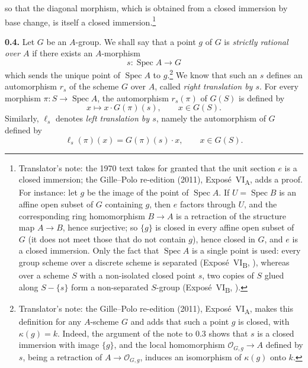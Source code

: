 \begin{center}
  \label{sga3:VIA:0.3-cartesian-square}
\end{center}
so that the diagonal morphism, which is obtained from a closed immersion
by base change, is itself a closed immersion.\footnote{Translator's note: the 1970 text takes for granted that the unit
section \(e\) is a closed immersion; the Gille--Polo re-edition (2011), Exposé~VI\textsubscript{A}, adds a
proof. For instance: let \(g\) be the image of the point of \(\operatorname{Spec}A\). If
\(U=\operatorname{Spec}B\) is an affine open subset of \(G\) containing \(g\), then \(e\) factors through
\(U\), and the corresponding ring homomorphism \(B\to A\) is a retraction of the structure map
\(A\to B\), hence surjective; so \(\{g\}\) is closed in every affine open subset of \(G\) (it does not
meet those that do not contain \(g\)), hence closed in \(G\), and \(e\) is a closed immersion. Only the
fact that \(\operatorname{Spec}A\) is a single point is used: every group scheme over a discrete scheme
is separated (Exposé~VI\textsubscript{B}, ), whereas over a scheme \(S\) with a
non-isolated closed point \(s\), two copies of \(S\) glued along \(S-\{s\}\) form a non-separated
\(S\)-group (Exposé~VI\textsubscript{B}, ).}


\medskip
\noindent\textbf{0.4.}
\label{sga3:VIA:0.4}
Let \(G\) be an \(A\)-group. We shall say that a point \(g\) of \(G\) is
\emph{strictly rational over \(A\)} if there exists an \(A\)-morphism
\[
  s:\operatorname{Spec}A\longrightarrow G
\]
which sends the unique point of \(\operatorname{Spec}A\) to \(g\).\footnote{Translator's note: the Gille--Polo re-edition (2011),
Exposé~VI\textsubscript{A}, makes this definition for any \(A\)-scheme \(G\) and adds that such a
point \(g\) is closed, with \(\kappa(g)=k\). Indeed, the argument of the note to 0.3 shows that \(s\) is
a closed immersion with image \(\{g\}\), and the local homomorphism \(\mathcal O_{G,g}\to A\) defined
by \(s\), being a retraction of \(A\to\mathcal O_{G,g}\), induces an isomorphism of \(\kappa(g)\)
onto \(k\).} We know
that such an \(s\) defines an automorphism \(r_s\) of the
scheme \(G\) over \(A\), called \emph{right translation by \(s\)}. For
every morphism \(\pi:S\to\operatorname{Spec}A\), the automorphism
\(r_s(\pi)\) of \(G(S)\) is defined by
\[
  x\longmapsto x\cdot G(\pi)(s),
  \qquad x\in G(S).
\]
Similarly, \(\ell_s\) denotes \emph{left translation by \(s\)}, namely
the automorphism of \(G\) defined by
\[
  \ell_s(\pi)(x)=G(\pi)(s)\cdot x,
  \qquad x\in G(S).
\]

